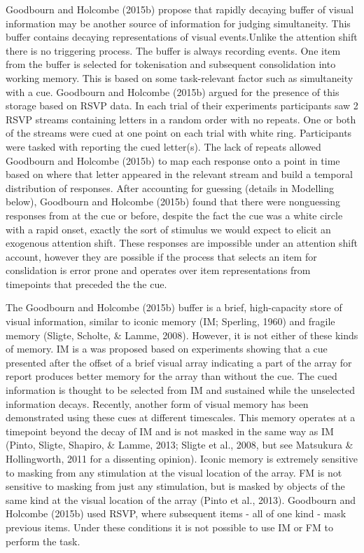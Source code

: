 \documentclass[,man]{apa6}
\theoremstyle{definition}
\theoremstyle{definition}
\theoremstyle{definition}
\theoremstyle{remark}
\begin{document}
Goodbourn and Holcombe (2015b) propose that rapidly decaying buffer of
visual information may be another source of information for judging
simultaneity. This buffer contains decaying representations of visual
events.Unlike the attention shift there is no triggering process. The
buffer is always recording events. One item from the buffer is selected
for tokenisation and subsequent consolidation into working memory. This
is based on some task-relevant factor such as simultaneity with a cue.
Goodbourn and Holcombe (2015b) argued for the presence of this storage
based on RSVP data. In each trial of their experiments participants saw
2 RSVP streams containing letters in a random order with no repeats. One
or both of the streams were cued at one point on each trial with white
ring. Participants were tasked with reporting the cued letter(s). The
lack of repeats allowed Goodbourn and Holcombe (2015b) to map each
response onto a point in time based on where that letter appeared in the
relevant stream and build a temporal distribution of responses. After
accounting for guessing (details in Modelling below), Goodbourn and
Holcombe (2015b) found that there were nonguessing responses from at the
cue or before, despite the fact the cue was a white circle with a rapid
onset, exactly the sort of stimulus we would expect to elicit an
exogenous attention shift. These responses are impossible under an
attention shift account, however they are possible if the process that
selects an item for conslidation is error prone and operates over item
representations from timepoints that preceded the the cue.

The Goodbourn and Holcombe (2015b) buffer is a brief, high-capacity
store of visual information, similar to iconic memory (IM; Sperling,
1960) and fragile memory (Sligte, Scholte, \& Lamme, 2008). However, it
is not either of these kinds of memory. IM is a was proposed based on
experiments showing that a cue presented after the offset of a brief
visual array indicating a part of the array for report produces better
memory for the array than without the cue. The cued information is
thought to be selected from IM and sustained while the unselected
information decays. Recently, another form of visual memory has been
demonstrated using these cues at different timescales. This memory
operates at a timepoint beyond the decay of IM and is not masked in the
same way as IM (Pinto, Sligte, Shapiro, \& Lamme, 2013; Sligte et al.,
2008, but see Matsukura \& Hollingworth, 2011 for a dissenting opinion).
Iconic memory is extremely sensitive to masking from any stimulation at
the visual location of the array. FM is not sensitive to masking from
just any stimulation, but is masked by objects of the same kind at the
visual location of the array (Pinto et al., 2013). Goodbourn and
Holcombe (2015b) used RSVP, where subsequent items - all of one kind -
mask previous items. Under these conditions it is not possible to use IM
or FM to perform the task.
\end{document}
